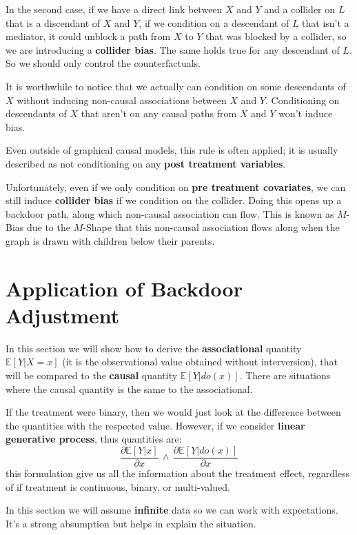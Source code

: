 In the second case, if we have a direct link between $X$ and $Y$ and a collider
on $L$ that is a discendant of $X$ and $Y$, if we condition on a descendant of $L$
that isn't a mediator, it could unblock a path
from $X$ to $Y$ that was blocked by a collider, so we are introducing a \textbf{collider bias}.
The same holds true for any descendant of $L$. So we should only control the counterfactuals.

It is worthwhile to notice that we actually can condition on some descendants of $X$
without inducing non-causal associations between $X$ and $Y$.
Conditioning on descendants of $X$ that aren't on any causal paths from $X$ and $Y$
won't induce bias.

Even outside of graphical causal models, this rule is often applied; it is usually described
as not conditioning on any \textbf{post treatment variables}.

Unfortunately, even if we only condition on \textbf{pre treatment covariates}, we can still
induce \textbf{collider bias} if we condition on the collider.
Doing this opens up a backdoor path, along which non-causal association can flow. This is
known as $M$-Bias due to the $M$-Shape that this non-causal association flows along
when the graph is drawn with children below their parents.

\section{Application of Backdoor Adjustment}
In this section we will show how to derive the \textbf{associational} quantity
$\mathbb{E}[Y|X = x]$ (it is the observational value obtained without interversion),
that will be compared to the \textbf{causal} quantity $\mathbb{E}[Y|do(x)]$. There
are situations where the causal quantity is the same to the associational.

If the treatment were binary, then we would just look at the difference between
the quantities with the respected value. However, if we consider \textbf{linear
    generative process}, thus quantities are:
\begin{equation}
    \frac{\partial\mathbb{E}[Y |x]}{\partial x } \, \land \, \frac{\partial\mathbb{E}[Y |do(x)]}{\partial x}
\end{equation}
this formulation give us all the information about the treatment effect, regardless of if treatment is continuous, binary, or multi-valued.

\begin{note}
    In this section we will assume \textbf{infinite} data so we can work with expectations.
    It's a strong absumption but helps in explain the situation.
\end{note}

